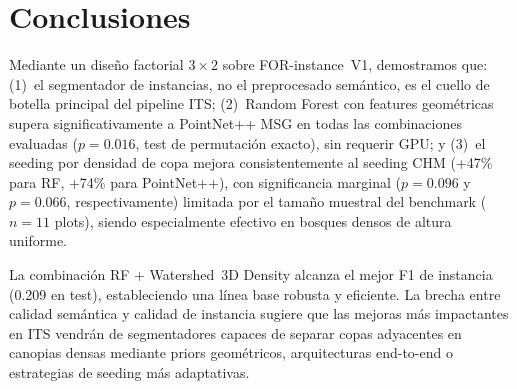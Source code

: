 \documentclass[runningheads]{llncs}
\begin{document}
\section{Conclusiones}\label{sec:conclusions}

Mediante un dise\~no factorial $3 \times 2$ sobre FOR-instance~V1, demostramos que: (1)~el segmentador de instancias, no el preprocesado sem\'antico, es el cuello de botella principal del pipeline ITS; (2)~Random Forest con features geom\'etricas supera significativamente a PointNet++ MSG en todas las combinaciones evaluadas ($p=0.016$, test de permutaci\'on exacto), sin requerir GPU; y (3)~el seeding por densidad de copa mejora consistentemente al seeding CHM (+47\% para RF, +74\% para PointNet++), con significancia marginal ($p=0.096$ y $p=0.066$, respectivamente) limitada por el tama\~no muestral del benchmark ($n=11$ plots), siendo especialmente efectivo en bosques densos de altura uniforme.

La combinación RF + Watershed~3D Density alcanza el mejor F1 de instancia (0.209 en test), estableciendo una línea base robusta y eficiente. La brecha entre calidad semántica y calidad de instancia sugiere que las mejoras más impactantes en ITS vendrán de segmentadores capaces de separar copas adyacentes en canopias densas mediante priors geométricos, arquitecturas end-to-end o estrategias de seeding más adaptativas.
\end{document}

